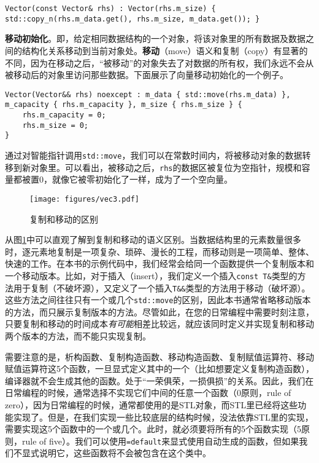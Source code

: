 \begin{lstlisting}
Vector(const Vector& rhs) : Vector(rhs.m_size) { std::copy_n(rhs.m_data.get(), rhs.m_size, m_data.get()); }
\end{lstlisting}

\textbf{移动初始化}。即，给定相同数据结构的一个对象，将该对象里的所有数据及数据之间的结构化关系移动到当前对象处。\textbf{移动}（move）语义和复制（copy）有显著的不同，因为在移动之后，“被移动”的对象失去了对数据的所有权，我们永远不会从被移动后的对象里访问那些数据。下面展示了向量移动初始化的一个例子。

\begin{lstlisting}
Vector(Vector&& rhs) noexcept : m_data { std::move(rhs.m_data) }, m_capacity { rhs.m_capacity }, m_size { rhs.m_size } {
    rhs.m_capacity = 0;
    rhs.m_size = 0;
}
\end{lstlisting}

通过对智能指针调用\lstinline{std::move}，我们可以在常数时间内，将被移动对象的数据转移到新对象里。可以看出，被移动之后，\lstinline{rhs}的数据区被复位为空指针，规模和容量都被置0，就像它被零初始化了一样，成为了一个空向量。

\begin{figure}
  \centering
  \texttt{[image: figures/vec3.pdf]}
  \caption{复制和移动的区别}
  \label{fig:vec3}
\end{figure}

从图\ref{fig:vec3}中可以直观了解到复制和移动的语义区别。当数据结构里的元素数量很多时，逐元素地复制是一项复杂、琐碎、漫长的工程，而移动则是一项简单、整体、快速的工作。在本书的示例代码中，我们经常会给同一个函数提供一个复制版本和一个移动版本。比如，对于插入（insert），我们定义一个插入\lstinline{const T&}类型的方法用于复制（不破坏源），又定义了一个插入\lstinline{T&&}类型的方法用于移动（破坏源）。这些方法之间往往只有一个或几个\lstinline{std::move}的区别，因此本书通常省略移动版本的方法，而只展示复制版本的方法。尽管如此，在您的日常编程中需要时刻注意，只要复制和移动的时间成本\textit{有可能}相差比较远，就应该同时定义并实现复制和移动两个版本的方法，而不能只实现复制。

需要注意的是，析构函数、复制构造函数、移动构造函数、复制赋值运算符、移动赋值运算符这5个函数，一旦显式定义其中的一个（比如想要定义复制构造函数），编译器就不会生成其他的函数。处于“一荣俱荣，一损俱损”的关系。因此，我们在日常编程的时候，通常选择不实现它们中间的任意一个函数（0原则，rule of zero），因为日常编程的时候，通常都使用的是STL对象，而STL里已经将这些功能实现了。但是，在我们实现一些比较底层的结构时候，没法依靠STL里的实现，需要实现这5个函数中的一个或几个。此时，就必须要将所有的5个函数实现（5原则，rule of five）。我们可以使用\lstinline{=default}来显式使用自动生成的函数，但如果我们不显式说明它，这些函数将不会被包含在这个类中。

